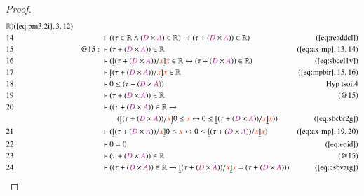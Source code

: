 \begin{proof}
\begin{align}
      \mathbb{R} )&(\mbox{\ref{eq:pm3.2i}},3,12)\notag
  \\ 14 &&  & \vdash ( ( \tau \in \mathbb{R} \wedge ( \mc{D} \times \mc{A} ) \in
      \mathbb{R} ) \rightarrow ( \tau + ( \mc{D} \times
      \mc{A} ) ) \in \mathbb{R}
      )&(\mbox{\ref{eq:readdcl}})\notag
  \\ 15 && @15:\  & \vdash ( \tau + ( \mc{D} \times \mc{A} ) ) \in
      \mathbb{R}&(\mbox{\ref{eq:ax-mp}},13,14)\notag
  \\ 16 &&  & \vdash ( \underaccent{\dot}{[} ( \tau + ( \mc{D} \times \mc{A} ) )
      / \msc{x} \underaccent{\dot}{]} \msc{x} \in
      \mathbb{R} \leftrightarrow ( \tau + ( \mc{D} \times
      \mc{A} ) ) \in \mathbb{R}
      )&(\mbox{\ref{eq:sbcel1v}})\notag
  \\ 17 &&  & \vdash \underaccent{\dot}{[} ( \tau + ( \mc{D} \times \mc{A} ) ) /
      \msc{x} \underaccent{\dot}{]} \msc{x} \in
      \mathbb{R}&(\mbox{\ref{eq:mpbir}},15,16)\notag
  \\ 18 &&  & \vdash 0 \le ( \tau + ( \mc{D} \times \mc{A} )
      )&\text{Hyp~tsoi.4}\notag%
  \\ 19 &&  & \vdash ( \tau + ( \mc{D} \times \mc{A} ) ) \in
      \mathbb{R}&(@15)\notag
  \\ 20 &&  & \vdash ( ( \tau + ( \mc{D} \times \mc{A} ) ) \in \mathbb{R}
      \rightarrow  \notag \\ & & & \qquad
      ( \underaccent{\dot}{[} ( \tau + ( \mc{D}
      \times \mc{A} ) ) / \msc{x} \underaccent{\dot}{]} 0
      \le \msc{x} \leftrightarrow 0 \le \underline{[} (
      \tau + ( \mc{D} \times \mc{A} ) ) / \msc{x}
      \underline{]} \msc{x} )
      )&(\mbox{\ref{eq:sbcbr2g}})\notag
  \\ 21 &&  & \vdash ( \underaccent{\dot}{[} ( \tau + ( \mc{D} \times \mc{A} ) )
      / \msc{x} \underaccent{\dot}{]} 0 \le \msc{x}
      \leftrightarrow 0 \le \underline{[} ( \tau + ( \mc{D}
      \times \mc{A} ) ) / \msc{x} \underline{]} \msc{x}
      )&(\mbox{\ref{eq:ax-mp}},19,20)\notag
  \\ 22 &&  & \vdash 0 = 0&(\mbox{\ref{eq:eqid}})\notag
  \\ 23 &&  & \vdash ( \tau + ( \mc{D} \times \mc{A} ) ) \in
      \mathbb{R}&(@15)\notag
  \\ 24 &&  & \vdash ( ( \tau + ( \mc{D} \times \mc{A} ) ) \in \mathbb{R}
      \rightarrow \underline{[} ( \tau + ( \mc{D} \times
      \mc{A} ) ) / \msc{x} \underline{]} \msc{x} = ( \tau +
      ( \mc{D} \times \mc{A} ) )
      )&(\mbox{\ref{eq:csbvarg}})\notag

\end{align}
\end{proof}
